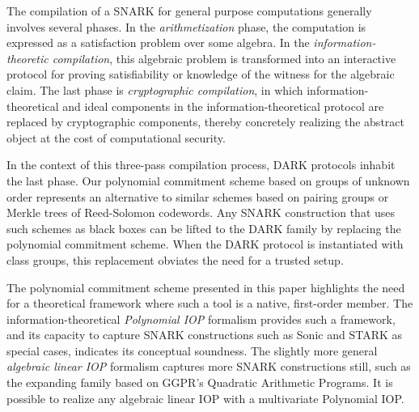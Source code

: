 
The compilation of a SNARK for general purpose computations generally involves several phases. In the \emph{arithmetization} phase, the computation is expressed as a satisfaction problem over some algebra. In the \emph{information-theoretic compilation}, this algebraic problem is transformed into an interactive protocol for proving satisfiability or knowledge of the witness for the algebraic claim. The last phase is \emph{cryptographic compilation}, in which information-theoretical and ideal components in the information-theoretical protocol are replaced by cryptographic components, thereby concretely realizing the abstract object at the cost of computational security. 

In the context of this three-pass compilation process, DARK protocols inhabit the last phase. Our polynomial commitment scheme based on groups of unknown order represents an alternative to similar schemes based on pairing groups or Merkle trees of Reed-Solomon codewords. Any SNARK construction that uses such schemes as black boxes can be lifted to the DARK family by replacing the polynomial commitment scheme. When the DARK protocol is instantiated with class groups, this replacement obviates the need for a trusted setup.

The polynomial commitment scheme presented in this paper highlights the need for a theoretical framework where such a tool is a native, first-order member.  The information-theoretical \emph{Polynomial IOP} formalism provides such a framework, and its capacity to capture SNARK constructions such as \textsf{Sonic} and \textsf{STARK} as special cases, indicates its conceptual soundness. The slightly more general \emph{algebraic linear IOP} formalism captures more SNARK constructions still, such as the expanding family based on GGPR's Quadratic Arithmetic Programs. It is possible to realize any algebraic linear IOP with a multivariate Polynomial IOP.

